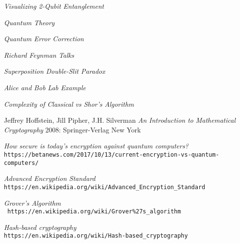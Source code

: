 \documentclass[12pt]{article}
\begin{document}
\newpage
\begin{thebibliography}{1}
  
   {\em Visualizing 2-Qubit Entanglement}\\ 
  
   {\em Quantum Theory}\\
  
   {\em Quantum Error Correction}\\
  
   {\em Richard Feynman Talks}\\
  
   {\em Superposition Double-Slit Paradox}\\
  
   {\em Alice and Bob Lab Example}\\

   {\em Complexity of Classical vs Shor's Algorithm}\\ 
  
   Jeffrey Hoffstein, Jill Pipher, J.H. Silverman {\em An Introduction to Mathematical Cryptography} 2008: Springer-Verlag New York
  
   {\em How secure is today's encryption against quantum computers?}\\ \texttt{https://betanews.com/2017/10/13/current-encryption-vs-quantum-computers/}
  
   {\em Advanced Encryption Standard}\\ \texttt{https://en.wikipedia.org/wiki/Advanced_Encryption_Standard}
  
   {\em Grover's Algorithm}\\ \texttt{ https://en.wikipedia.org/wiki/Grover\%27s\_algorithm}
  
   {\em Hash-based cryptography}\\ \texttt{https://en.wikipedia.org/wiki/Hash-based_cryptography}
  

\end{thebibliography}
\end{document}
